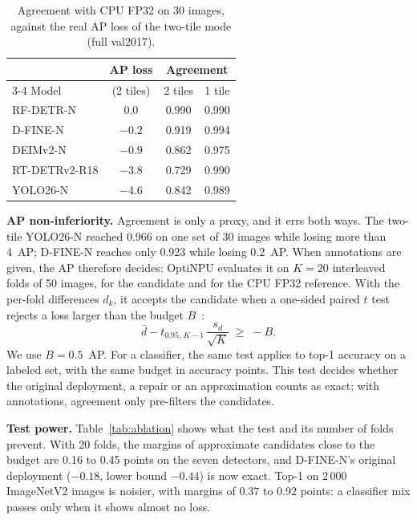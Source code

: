 \documentclass[conference]{IEEEtran}
\newcommand{\tool}{OptiNPU}
\begin{document}
\begin{table}[t]
\caption{Agreement with CPU FP32 on 30 images, against the real AP loss of the two-tile mode (full val2017).}
\label{tab:guard}
\centering
\footnotesize
\begin{tabular}{@{}lccc@{}}
\toprule
& AP loss & \multicolumn{2}{c}{Agreement} \\
\cmidrule(l){3-4}
Model & (2 tiles) & 2 tiles & 1 tile \\
\midrule
RF-DETR-N & 0.0 & 0.990 & 0.990 \\
D-FINE-N & $-0.2$ & 0.919 & 0.994 \\
DEIMv2-N & $-0.9$ & 0.862 & 0.975 \\
RT-DETRv2-R18 & $-3.8$ & 0.729 & 0.990 \\
YOLO26-N & $-4.6$ & 0.842 & 0.989 \\
\bottomrule
\end{tabular}
\end{table}

\textbf{AP non-inferiority.} Agreement is only a proxy, and it errs both ways. The two-tile YOLO26-N reached 0.966 on one set of 30 images while losing more than 4~AP; D-FINE-N reaches only 0.923 while losing 0.2~AP. When annotations are given, the AP therefore decides: \tool{} evaluates it on $K = 20$ interleaved folds of 50 images, for the candidate and for the CPU FP32 reference. With the per-fold differences $d_k$, it accepts the candidate when a one-sided paired $t$ test rejects a loss larger than the budget $B$~\cite{wellek2010testing}:
\begin{equation}
\bar d - t_{0.95,\,K-1}\, \frac{s_d}{\sqrt{K}} \;\geq\; -B .
\label{eq:noninf}
\end{equation}
We use $B = 0.5$~AP. For a classifier, the same test applies to top-1 accuracy on a labeled set, with the same budget in accuracy points. This test decides whether the original deployment, a repair or an approximation counts as exact; with annotations, agreement only pre-filters the candidates.

\textbf{Test power.} Table~\ref{tab:ablation} shows what the test and its number of folds prevent. With 20 folds, the margins of approximate candidates close to the budget are 0.16 to 0.45 points on the seven detectors, and D-FINE-N's original deployment ($-0.18$, lower bound $-0.44$) is now exact. Top-1 on 2\,000 ImageNetV2 images is noisier, with margins of 0.37 to 0.92 points: a classifier mix passes only when it shows almost no loss.
\end{document}
